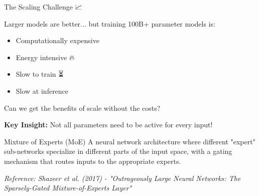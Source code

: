 \documentclass[aspectratio=169]{beamer}
\begin{document}
\begin{frame}{The Scaling Challenge 📈}
\begin{discussionbox}
Larger models are better... but training 100B+ parameter models is:
\begin{itemize}\setlength{\itemsep}{0pt}
    \item Computationally expensive 💸
    \item Energy intensive 🔥
    \item Slow to train ⏳
    \item Slow at inference 🐌
\end{itemize}

Can we get the benefits of scale without the costs?
\end{discussionbox}

\vspace{1em}

\textbf{Key Insight:} Not all parameters need to be active for every input!

\vspace{0.5em}

\begin{block}{Mixture of Experts (MoE)}
A neural network architecture where different "expert" sub-networks specialize in different parts of the input space, with a gating mechanism that routes inputs to the appropriate experts.
\end{block}

\small
\textit{Reference: Shazeer et al. (2017) - "Outrageously Large Neural Networks: The Sparsely-Gated Mixture-of-Experts Layer"}
\end{frame}
\end{document}
